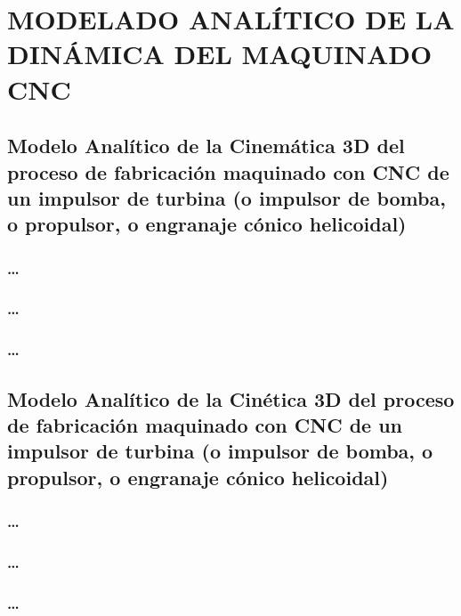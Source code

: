 \section{MODELADO ANALÍTICO DE LA DINÁMICA DEL MAQUINADO CNC}

\subsection{Modelo Analítico de la Cinemática 3D del proceso de fabricación maquinado con CNC de un impulsor de turbina (o impulsor de bomba, o propulsor, o engranaje cónico helicoidal)}

\subsubsection{\ldots}

\subsubsection{\ldots}

\subsubsection{\ldots}

\subsection{Modelo Analítico de la Cinética 3D del proceso de fabricación maquinado con CNC de un impulsor de turbina (o impulsor de bomba, o propulsor, o engranaje cónico helicoidal)}

\subsubsection{\ldots}

\subsubsection{\ldots}

\subsubsection{\ldots}